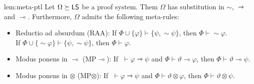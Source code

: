 \documentclass[a4paper,english,fleqn,11pt,final]{scrartcl}
\newcommand{\negg}{{\sim}}
\newcommand{\sfS}{\protect\ensuremath{\mathsf{S}}}
\newcommand{\sfL}{\protect\ensuremath{\mathsf{L}}}
\newcommand{\limp}{\multimap}
\newcommand{\timp}{\rightarrowtriangle}
\newcommand{\tens}{\otimes}
\newcommand{\Deriv}[1]{{\normalfont\textsf{#1}}}
\theoremstyle{plain}
\theoremstyle{definition}
\begin{document}
\begin{replemma}{lem:meta-ptl}
Let $\Omega \succeq \sfL\sfS$ be a proof system.
Them $\Omega$ has substitution in $\negg$, $\timp$ and $\limp$.
Furthermore, $\Omega$ admits the following meta-rules:
\begin{itemize}
	\item Reductio ad absurdum \Deriv{(RAA)}:
	If $\Phi \cup \{\varphi\} \vdash \{\psi, \negg \psi\}$, then $\Phi \vdash\negg\varphi$.\\
	If $\Phi \cup \{\negg\varphi\} \vdash \{\psi, \negg \psi\}$, then $\Phi \vdash \varphi$.
	\item Modus ponens in $\limp$ \Deriv{(MP$\limp$)}:
	If $\;\vdash \varphi \timp \psi$ and $\Phi \vdash \vartheta \limp \varphi$, then $\Phi \vdash \vartheta \limp \psi$.
	\item Modus ponens in $\tens$ \Deriv{(MP$\tens$)}:
	If $\;\vdash \varphi \timp \psi$ and $\Phi \vdash \vartheta \tens \varphi$, then $\Phi \vdash \vartheta \tens \psi$.
\end{itemize}
\end{replemma}
\end{document}
